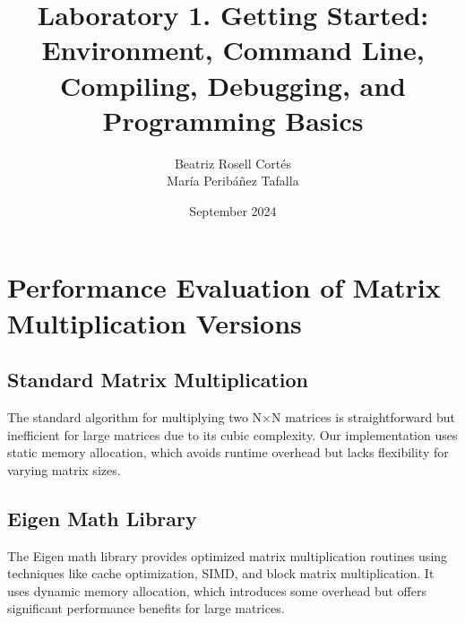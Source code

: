 \documentclass{article}
\title{\textbf{Laboratory 1. Getting Started: Environment, Command Line, Compiling, Debugging, and Programming Basics}}
\author{Beatriz Rosell Cortés \\
María Peribáñez Tafalla}
\date{September 2024}
\begin{document}
\maketitle

\section{Performance Evaluation of Matrix Multiplication Versions}

\subsection{Standard Matrix Multiplication}
The standard algorithm for multiplying two N×N matrices is straightforward but inefficient for large matrices due to its cubic complexity. Our implementation uses static memory allocation, which avoids runtime overhead but lacks flexibility for varying matrix sizes.

\subsection{Eigen Math Library}
The Eigen math library provides optimized matrix multiplication routines using techniques like cache optimization, SIMD, and block matrix multiplication. It uses dynamic memory allocation, which introduces some overhead but offers significant performance benefits for large matrices.
\end{document}

